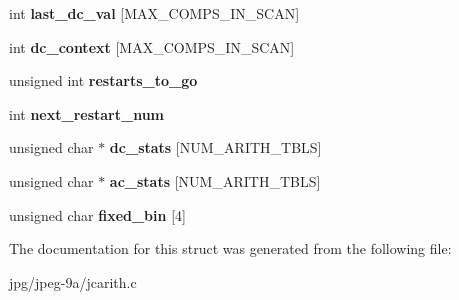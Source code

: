 \begin{DoxyCompactItemize}
\item 
\hypertarget{structarith__entropy__encoder_a60ba4c07f691b539ba51a25a20dc38ae}{int {\bfseries last\+\_\+dc\+\_\+val} \mbox{[}M\+A\+X\+\_\+\+C\+O\+M\+P\+S\+\_\+\+I\+N\+\_\+\+S\+C\+A\+N\mbox{]}}\label{structarith__entropy__encoder_a60ba4c07f691b539ba51a25a20dc38ae}

\item 
\hypertarget{structarith__entropy__encoder_a1f8bc39ac0327ddbf46c65434d0ceb75}{int {\bfseries dc\+\_\+context} \mbox{[}M\+A\+X\+\_\+\+C\+O\+M\+P\+S\+\_\+\+I\+N\+\_\+\+S\+C\+A\+N\mbox{]}}\label{structarith__entropy__encoder_a1f8bc39ac0327ddbf46c65434d0ceb75}

\item 
\hypertarget{structarith__entropy__encoder_add27b20b9b70a05f49c4242844253109}{unsigned int {\bfseries restarts\+\_\+to\+\_\+go}}\label{structarith__entropy__encoder_add27b20b9b70a05f49c4242844253109}

\item 
\hypertarget{structarith__entropy__encoder_ad523833a7d6fa8c645fb9d18de18b487}{int {\bfseries next\+\_\+restart\+\_\+num}}\label{structarith__entropy__encoder_ad523833a7d6fa8c645fb9d18de18b487}

\item 
\hypertarget{structarith__entropy__encoder_add54e8b278b9eea4aa6ee85ea2de4307}{unsigned char $\ast$ {\bfseries dc\+\_\+stats} \mbox{[}N\+U\+M\+\_\+\+A\+R\+I\+T\+H\+\_\+\+T\+B\+L\+S\mbox{]}}\label{structarith__entropy__encoder_add54e8b278b9eea4aa6ee85ea2de4307}

\item 
\hypertarget{structarith__entropy__encoder_a42b982c858027226af51485fa8b0bf22}{unsigned char $\ast$ {\bfseries ac\+\_\+stats} \mbox{[}N\+U\+M\+\_\+\+A\+R\+I\+T\+H\+\_\+\+T\+B\+L\+S\mbox{]}}\label{structarith__entropy__encoder_a42b982c858027226af51485fa8b0bf22}

\item 
\hypertarget{structarith__entropy__encoder_a06cb7a9a6db5a785f6630e5b5606ae5d}{unsigned char {\bfseries fixed\+\_\+bin} \mbox{[}4\mbox{]}}\label{structarith__entropy__encoder_a06cb7a9a6db5a785f6630e5b5606ae5d}

\end{DoxyCompactItemize}


The documentation for this struct was generated from the following file\+:\begin{DoxyCompactItemize}
\item 
jpg/jpeg-\/9a/jcarith.\+c\end{DoxyCompactItemize}
